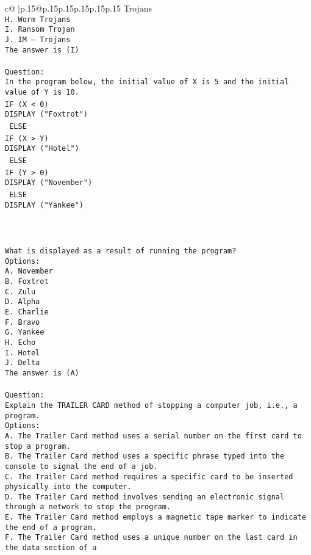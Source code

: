 \documentclass{article}
\begin{document}
{\begin{supertabular}{c@{$\;$}|p{.15\linewidth}@{}p{.15\linewidth}p{.15\linewidth}p{.15\linewidth}p{.15\linewidth}p{.15\linewidth}}
{{{Trojans\\ \tt H. Worm Trojans\\ \tt I. Ransom Trojan\\ \tt J. IM – Trojans\\ \tt The answer is (I)\\ \tt \\ \tt Question:\\ \tt In the program below, the initial value of X is 5 and the initial value of Y is 10.\\ \tt IF (X < 0){\\ \tt  DISPLAY ("Foxtrot")\\ \tt } ELSE {\\ \tt  IF (X > Y){\\ \tt   DISPLAY ("Hotel")\\ \tt  } ELSE {\\ \tt   IF (Y > 0){\\ \tt    DISPLAY ("November")\\ \tt   } ELSE {\\ \tt    DISPLAY ("Yankee")\\ \tt   }\\ \tt  }\\ \tt }\\ \tt What is displayed as a result of running the program?\\ \tt Options:\\ \tt A. November\\ \tt B. Foxtrot\\ \tt C. Zulu\\ \tt D. Alpha\\ \tt E. Charlie\\ \tt F. Bravo\\ \tt G. Yankee\\ \tt H. Echo\\ \tt I. Hotel\\ \tt J. Delta\\ \tt The answer is (A)\\ \tt \\ \tt Question:\\ \tt Explain the TRAILER CARD method of stopping a computer job, i.e., a program.\\ \tt Options:\\ \tt A. The Trailer Card method uses a serial number on the first card to stop a program.\\ \tt B. The Trailer Card method uses a specific phrase typed into the console to signal the end of a job.\\ \tt C. The Trailer Card method requires a specific card to be inserted physically into the computer.\\ \tt D. The Trailer Card method involves sending an electronic signal through a network to stop the program.\\ \tt E. The Trailer Card method employs a magnetic tape marker to indicate the end of a program.\\ \tt F. The Trailer Card method uses a unique number on the last card in the data section of a }}}
\end{supertabular}}
\end{document}
